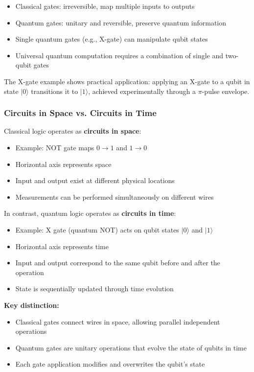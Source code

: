 \documentclass{article}
\begin{document}
\begin{itemize}
    \item Classical gates: irreversible, map multiple inputs to outputs
    \item Quantum gates: unitary and reversible, preserve quantum information
    \item Single quantum gates (e.g., X-gate) can manipulate qubit states
    \item Universal quantum computation requires a combination of single and two-qubit gates
\end{itemize}

The X-gate example shows practical application: applying an X-gate to a qubit in state $|0\rangle$ transitions it to $|1\rangle$, achieved experimentally through a $\pi$-pulse envelope.

\subsubsection*{Circuits in Space vs. Circuits in Time}

Classical logic operates as \textbf{circuits in space}:
\begin{itemize}
    \item Example: NOT gate maps $0 \to 1$ and $1 \to 0$
    \item Horizontal axis represents space
    \item Input and output exist at different physical locations
    \item Measurements can be performed simultaneously on different wires
\end{itemize}

In contrast, quantum logic operates as \textbf{circuits in time}:
\begin{itemize}
    \item Example: X gate (quantum NOT) acts on qubit states $|0\rangle$ and $|1\rangle$
    \item Horizontal axis represents time
    \item Input and output correspond to the same qubit before and after the operation
    \item State is sequentially updated through time evolution
\end{itemize}

\textbf{Key distinction:}
\begin{itemize}
    \item Classical gates connect wires in space, allowing parallel independent operations
    \item Quantum gates are unitary operations that evolve the state of qubits in time
    \item Each gate application modifies and overwrites the qubit's state
\end{itemize}
\end{document}
